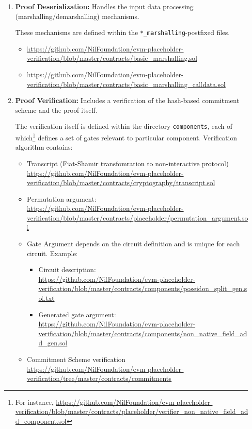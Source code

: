 \begin{enumerate}
    \item \textbf{Proof Deserialization:} Handles the input data processing (marshalling/demarshalling) mechanisms.

    These mechanisms are defined within the \texttt{*\_marshalling}-postfixed files.
    \begin{itemize}
        \item \url{https://github.com/NilFoundation/evm-placeholder-verification/blob/master/contracts/basic_marshalling.sol}
        \item \url{https://github.com/NilFoundation/evm-placeholder-verification/blob/master/contracts/basic_marshalling_calldata.sol}
    \end{itemize}

    \item \textbf{Proof Verification:} Includes a verification of the hash-based commitment scheme and the proof itself.

    The verification itself is defined within the directory \texttt{components}, each of which\footnote{
        For instance, \url{https://github.com/NilFoundation/evm-placeholder-verification/blob/master/contracts/placeholder/verifier_non_native_field_add_component.sol}
    } defines a set of gates
    relevant to particular component.
    Verification algorithm contains:
    \begin{itemize}
        \item Transcript (Fiat-Shamir transfomration to non-interactive protocol) \\
            \url{https://github.com/NilFoundation/evm-placeholder-verification/blob/master/contracts/cryptography/transcript.sol}
        \item Permutation argument: \\
            \url{https://github.com/NilFoundation/evm-placeholder-verification/blob/master/contracts/placeholder/permutation_argument.sol}
        \item Gate Argument depends on the circuit definition and is unique for each circuit.
                Example:
            \begin{itemize}
                \item Circuit description: \\
                    \url{https://github.com/NilFoundation/evm-placeholder-verification/blob/master/contracts/components/poseidon_split_gen.sol.txt}
                \item Generated gate argument: \\
                    \url{https://github.com/NilFoundation/evm-placeholder-verification/blob/master/contracts/components/non_native_field_add_gen.sol} 
            \end{itemize}
        \item Commitment Scheme verification \\
            \url{https://github.com/NilFoundation/evm-placeholder-verification/tree/master/contracts/commitments}
    \end{itemize}
\end{enumerate}

